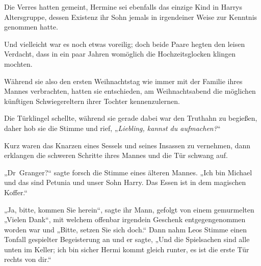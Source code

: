 Die Verres hatten gemeint, Hermine sei ebenfalls das einzige Kind in Harrys Altersgruppe, dessen Existenz ihr Sohn jemals in irgendeiner Weise zur Kenntnis genommen hatte.

Und vielleicht war es noch etwas voreilig; doch beide Paare hegten den leisen Verdacht, dass in ein paar Jahren womöglich die Hochzeitsglocken klingen mochten.

Während sie also den ersten Weihnachtstag wie immer mit der Familie ihres Mannes verbrachten, hatten sie entschieden, am Weihnachtsabend die möglichen künftigen Schwiegereltern ihrer Tochter kennenzulernen.

Die Türklingel schellte, während sie gerade dabei war den Truthahn zu begießen, daher hob sie die Stimme und rief, „\emph{Liebling, kannst du aufmachen?}“

Kurz waren das Knarzen eines Sessels und seines Insassen zu vernehmen, dann erklangen die schweren Schritte ihres Mannes und die Tür schwang auf.

„Dr~Granger?“ sagte forsch die Stimme eines älteren Mannes.
„Ich bin Michael und das sind Petunia und unser Sohn Harry. Das Essen ist in dem magischen Koffer.“

„Ja, bitte, kommen Sie herein“, sagte ihr Mann, gefolgt von einem gemurmelten
„Vielen Dank“, mit welchem offenbar irgendein Geschenk entgegengenommen worden war und
„Bitte, setzen Sie sich doch.“ Dann nahm Leos Stimme einen Tonfall gespielter Begeisterung an und er sagte,
„Und die Spielsachen sind alle unten im Keller; ich bin sicher Hermi kommt gleich runter, es ist die erste Tür rechts von dir.“

